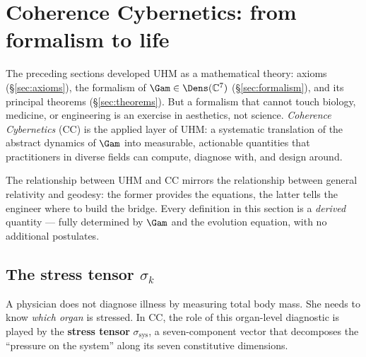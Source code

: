 
\section{Coherence Cybernetics: from formalism to life}
\label{sec:cc}

The preceding sections developed UHM as a mathematical theory: axioms (\S\ref{sec:axioms}),
the formalism of $\Gam \in \Dens(\mathbb{C}^7)$ (\S\ref{sec:formalism}), and its principal
theorems (\S\ref{sec:theorems}). But a formalism that cannot touch biology, medicine, or
engineering is an exercise in aesthetics, not science. \emph{Coherence Cybernetics} (CC) is
the applied layer of UHM: a systematic translation of the abstract dynamics of $\Gam$ into
measurable, actionable quantities that practitioners in diverse fields can compute, diagnose
with, and design around.

The relationship between UHM and CC mirrors the relationship between general relativity and
geodesy: the former provides the equations, the latter tells the engineer where to build the
bridge. Every definition in this section is a \emph{derived} quantity --- fully determined by
$\Gam$ and the evolution equation, with no additional postulates.

\subsection{The stress tensor $\sigma_k$}
\label{subsec:stress-tensor}

A physician does not diagnose illness by measuring total body mass.  She needs to know
\emph{which organ} is stressed.  In CC, the role of this organ-level diagnostic is played
by the \textbf{stress tensor} $\sigma_{\mathrm{sys}}$, a seven-component vector that
decomposes the ``pressure on the system'' along its seven constitutive dimensions.

